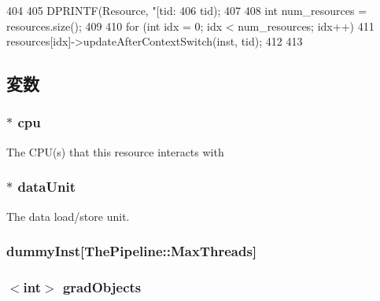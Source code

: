 \begin{DoxyCode}
404 {
405     DPRINTF(Resource, "[tid:%
406             tid);
407 
408     int num_resources = resources.size();
409 
410     for (int idx = 0; idx < num_resources; idx++) {
411         resources[idx]->updateAfterContextSwitch(inst, tid);
412     }
413 }
\end{DoxyCode}


\subsection{変数}
\hypertarget{classResourcePool_a41d682c28d0f49e04393c52815808782}{
\subsubsection[{cpu}]{$\ast$ {\bf cpu}}}
\label{classResourcePool_a41d682c28d0f49e04393c52815808782}
The CPU(s) that this resource interacts with \hypertarget{classResourcePool_a35963c6401a395a10f1b0d8eeb84e1ed}{
\subsubsection[{dataUnit}]{$\ast$ {\bf dataUnit}}}
\label{classResourcePool_a35963c6401a395a10f1b0d8eeb84e1ed}
The data load/store unit. \hypertarget{classResourcePool_a8f57f75c5150b34b12a0d461a8941704}{
\subsubsection[{dummyInst}]{ {\bf dummyInst}\mbox{[}{\bf ThePipeline::MaxThreads}\mbox{]}}}
\label{classResourcePool_a8f57f75c5150b34b12a0d461a8941704}
\hypertarget{classResourcePool_a62c7474a6f50366616afac7a3af89f08}{
\subsubsection[{gradObjects}]{$<$int$>$ {\bf gradObjects}}}
